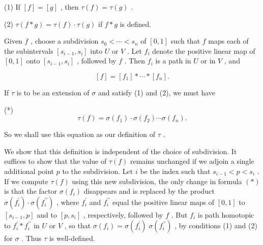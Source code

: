 \documentclass[10pt]{article}
\begin{document}
(1) If \(\left\lbrack  f\right\rbrack   = \left\lbrack  g\right\rbrack\) , then \(\tau \left( f\right)  = \tau \left( g\right)\) .

(2) \(\tau \left( {f * g}\right)  = \tau \left( f\right)  \cdot  \tau \left( g\right)\) if \(f * g\) is defined.

Given \(f\) , choose a subdivision \({s}_{0} < \cdots  < {s}_{n}\) of \(\left\lbrack  {0,1}\right\rbrack\) such that \(f\) maps each of the subintervals \(\left\lbrack  {{s}_{i - 1},{s}_{i}}\right\rbrack\) into \(U\) or \(V\) . Let \({f}_{i}\) denote the positive linear map of \(\left\lbrack  {0,1}\right\rbrack\) onto \(\left\lbrack  {{s}_{i - 1},{s}_{i}}\right\rbrack\) , followed by \(f\) . Then \({f}_{i}\) is a path in \(U\) or in \(V\) , and

\[
\left\lbrack  f\right\rbrack   = \left\lbrack  {f}_{1}\right\rbrack   * \cdots  * \left\lbrack  {f}_{n}\right\rbrack  .
\]

If \(\tau\) is to be an extension of \(\sigma\) and satisfy (1) and (2), we must have

(*)
\[
\tau \left( f\right)  = \sigma \left( {f}_{1}\right)  \cdot  \sigma \left( {f}_{2}\right) \cdots \sigma \left( {f}_{n}\right) .
\]

So we shall use this equation as our definition of \(\tau\) .

We show that this definition is independent of the choice of subdivision. It suffices to show that the value of \(\tau \left( f\right)\) remains unchanged if we adjoin a single additional point \(p\) to the subdivision. Let \(i\) be the index such that \({s}_{i - 1} < p < {s}_{i}\) . If we compute \(\tau \left( f\right)\) using this new subdivision, the only change in formula \(\left( *\right)\) is that the factor \(\sigma \left( {f}_{i}\right)\) disappears and is replaced by the product \(\sigma \left( {f}_{i}^{\prime }\right)  \cdot  \sigma \left( {f}_{i}^{\prime \prime }\right)\) , where \({f}_{i}^{\prime }\) and \({f}_{i}^{\prime \prime }\) equal the positive linear maps of \(\left\lbrack  {0,1}\right\rbrack\) to \(\left\lbrack  {{s}_{i - 1},p}\right\rbrack\) and to \(\left\lbrack  {p,{s}_{i}}\right\rbrack\) , respectively, followed by \(f\) . But \({f}_{i}\) is path homotopic to \({f}_{i}^{\prime } * {f}_{i}^{\prime \prime }\) in \(U\) or \(V\) , so that \(\sigma \left( {f}_{i}\right)  = \sigma \left( {f}_{i}^{\prime }\right) \;\sigma \left( {f}_{i}^{\prime \prime }\right)\) , by conditions (1) and (2) for \(\sigma\) . Thus \(\tau\) is well-defined.
\end{document}
